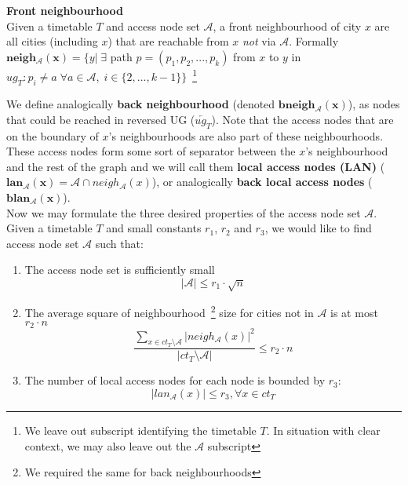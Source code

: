 	\begin{definition}
        \textbf{Front neighbourhood} \\
		Given a timetable $T$ and access node set $\mathcal{A}$, a front neighbourhood of city $x$ are all cities (including $x$) that are reachable from $x$ \textit{not} via $\mathcal{A}$. Formally $\bm{neigh_{\mathcal{A}}(x)} = \{y| \; \exists$ path $p = (p_{1}, p_{2}, ..., p_{k})$ from $x$ to $y$ in $ug_{T}: p_{i} \neq a \; \forall a \in \mathcal{A}, \; i \in \{2, ..., k - 1\} \}$~\footnote{We leave out subscript identifying the timetable $T$. In situation with clear context, we may also leave out the $\mathcal{A}$ subscript}
    \end{definition}
    
    \noindent We define analogically \textbf{back neighbourhood} (denoted $\bm{bneigh_{\mathcal{A}}(x)}$), as nodes that could be reached in reversed UG ($\overleftarrow{ug_{T}}$). Note that the access nodes that are on the boundary of $x$'s neighbourhoods are also part of these neighbourhoods. These access nodes form some sort of separator between the $x$'s neighbourhood and the rest of the graph and we will call them \textbf{local access nodes (LAN)} ($\bm{lan_{\mathcal{A}}(x)} = \mathcal{A} \cap neigh_{\mathcal{A}}(x)$), or analogically \textbf{back local access nodes} ($\bm{blan_{\mathcal{A}}(x)}$). \\
    
    \noindent Now we may formulate the three desired properties of the access node set $\mathcal{A}$. Given a timetable $T$ and small constants $r_{1}$, $r_{2}$ and $r_{3}$, we would like to find access node set $\mathcal{A}$ such that:
    \begin{enumerate}
		\item The access node set is sufficiently small \\
		\begin{equation} \label{eq:r1}
			|\mathcal{A}| \leq r_{1} \cdot \sqrt{n}
		\end{equation}
		\item The average square of neighbourhood~\footnote{We required the same for back neighbourhoods} size for cities not in $\mathcal{A}$ is at most $r_{2} \cdot n$ \\
		\begin{equation} \label{eq:r2}
			\frac{\displaystyle \sum_{x \in ct_{T} \setminus \mathcal{A}}|neigh_{\mathcal{A}}(x)|^{2}}{\displaystyle |ct_{T} \setminus \mathcal{A}|} \leq r_{2} \cdot n
		\end{equation}
		\item The number of local access nodes for each node is bounded by $r_{3}$: \\
		\begin{equation} \label{eq:r3}
			|lan_{\mathcal{A}}(x)| \leq r_{3}, \forall x \in ct_{T}
		\end{equation}
	\end{enumerate}
	\hspace{\fill}
	
